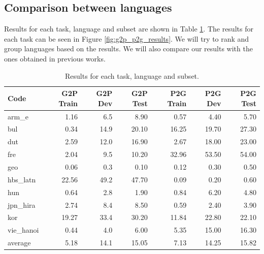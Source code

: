 \documentclass[11pt,a4paper]{article}
\begin{document}
\subsection{Comparison between languages}

Results for each task, language and subset are shown in Table \ref{tab:results}. The results for each task can be seen in Figure \ref{fig:g2p_p2g_results}. We will try to rank and group languages based on the results. We will also compare our results with the ones obtained in previous works.

\begin{table}[ht]
\centering
\begin{tabular}{lrrrrrr}
\toprule
      Code &  G2P Train &  G2P Dev &  G2P Test &  P2G Train &  P2G Dev &  P2G Test \\
\midrule
     arm\_e &       1.16 &      6.5 &      8.90 &       0.57 &     4.40 &      5.70 \\
       bul &       0.34 &     14.9 &     20.10 &      16.25 &    19.70 &     27.30 \\
       dut &       2.59 &     12.0 &     16.90 &       2.67 &    18.00 &     23.00 \\
       fre &       2.04 &      9.5 &     10.20 &      32.96 &    53.50 &     54.00 \\
       geo &       0.06 &      0.3 &      0.10 &       0.12 &     0.30 &      0.50 \\
  hbs\_latn &      22.56 &     49.2 &     47.70 &       0.09 &     0.20 &      0.60 \\
       hun &       0.64 &      2.8 &      1.90 &       0.84 &     6.20 &      4.80 \\
  jpn\_hira &       2.74 &      8.4 &      8.50 &       0.59 &     2.40 &      3.90 \\
       kor &      19.27 &     33.4 &     30.20 &      11.84 &    22.80 &     22.10 \\
 vie\_hanoi &       0.44 &      4.0 &      6.00 &       5.35 &    15.00 &     16.30 \\
 \midrule
   average &       5.18 &     14.1 &     15.05 &       7.13 &    14.25 &     15.82 \\
\bottomrule
\end{tabular}
\caption{Results for each task, language and subset.}
\label{tab:results}
\end{table}
\end{document}
